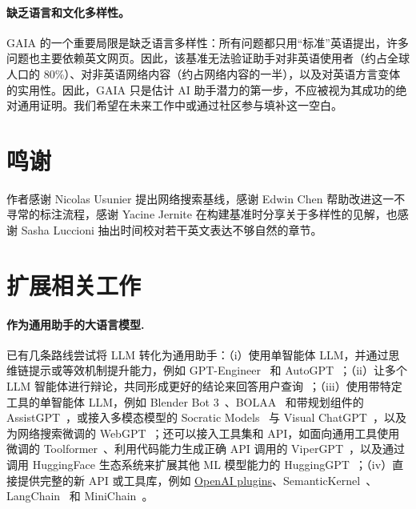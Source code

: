\documentclass{fairmeta}
\newcommand{\benchmark}{\textsc{GAIA}}
\begin{document}
\paragraph{缺乏语言和文化多样性。} \benchmark{} 的一个重要局限是缺乏语言多样性：所有问题都只用“标准”英语提出，许多问题也主要依赖英文网页。因此，该基准无法验证助手对非英语使用者（约占全球人口的 80\%）、对非英语网络内容（约占网络内容的一半），以及对英语方言变体的实用性。因此，\benchmark{} 只是估计 AI 助手潜力的第一步，不应被视为其成功的绝对通用证明。我们希望在未来工作中或通过社区参与填补这一空白。



\section{鸣谢}



作者感谢 Nicolas Usunier 提出网络搜索基线，感谢 Edwin Chen 帮助改进这一不寻常的标注流程，感谢 Yacine Jernite 在构建基准时分享关于多样性的见解，也感谢 Sasha Luccioni 抽出时间校对若干英文表达不够自然的章节。

\vspace{-0.3cm}





\newpage

\appendix


\section{扩展相关工作}
\label{sec:extended_related_work}

\paragraph{作为通用助手的大语言模型.}
已有几条路线尝试将 LLM 转化为通用助手：（i）使用单智能体 LLM，并通过思维链提示或等效机制提升能力，例如 GPT-Engineer~\citep{_osika-2023-gpt} 和 AutoGPT~\citep{_yang-etal-2023-autogpt}；（ii）让多个 LLM 智能体进行辩论，共同形成更好的结论来回答用户查询~\citep{_li-etal-2023-camel,_hong-etal-2023-metagpt,_chan-etal-2023-chateval,_talebirad-nadiri-2023-multiagent}；（iii）使用带特定工具的单智能体 LLM，例如 Blender Bot 3~\citep{shuster2022blenderbot}、BOLAA~\citep{_liu-etal-2023-bolaa} 和带规划组件的 AssistGPT~\citep{_gao-etal-2023-assistgpt}，或接入多模态模型的 Socratic Models~\citep{_zeng-etal-2022-socratic} 与 Visual ChatGPT~\citep{_wu-etal-2023-visual}，以及为网络搜索微调的 WebGPT~\citep{nakano2021webgpt}；还可以接入工具集和 API，如面向通用工具使用微调的 Toolformer~\citep{schick2023toolformer}、利用代码能力生成正确 API 调用的 ViperGPT~\citep{_suris-etal-2023-vipergpt}，以及通过调用 HuggingFace 生态系统来扩展其他 ML 模型能力的 HuggingGPT~\citep{_shen-etal-2023-hugginggpt}；（iv）直接提供完整的新 API 或工具库，例如 \href{https://openai.com/blog/chatgpt-plugins}{OpenAI plugins}、SemanticKernel~\citep{_microsoft-2023-semantic}、LangChain~\citep{_chase-2022-langchain} 和 MiniChain~\citep{_rush-2023-minichain}。
\end{document}
